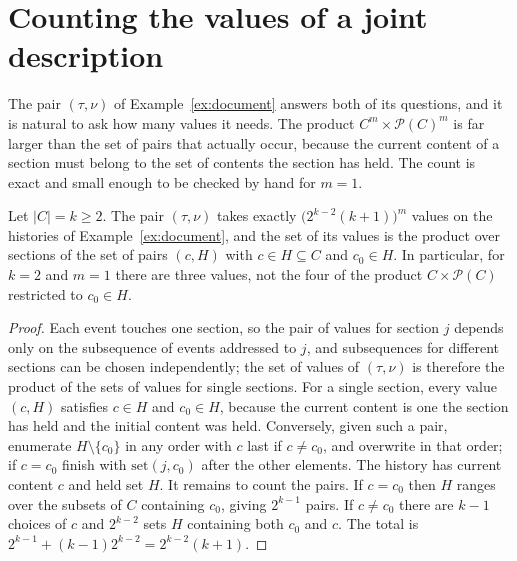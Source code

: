 \section{Counting the values of a joint description}\label{sec:doc-count}

The pair $(\tau,\nu)$ of Example~\ref{ex:document} answers both of its questions, and it is natural to ask how many values it needs. The product $C^{m}\times\mathcal P(C)^{m}$ is far larger than the set of pairs that actually occur, because the current content of a section must belong to the set of contents the section has held. The count is exact and small enough to be checked by hand for $m=1$.

\begin{newresult}\label{prop:doc-count}
Let $|C|=k\ge2$. The pair $(\tau,\nu)$ takes exactly $\bigl(2^{k-2}(k+1)\bigr)^{m}$ values on the histories of Example~\ref{ex:document}, and the set of its values is the product over sections of the set of pairs $(c,H)$ with $c\in H\subseteq C$ and $c_0\in H$. In particular, for $k=2$ and $m=1$ there are three values, not the four of the product $C\times\mathcal P(C)$ restricted to $c_0\in H$.
\end{newresult}
\begin{proof}
Each event touches one section, so the pair of values for section $j$ depends only on the subsequence of events addressed to $j$, and subsequences for different sections can be chosen independently; the set of values of $(\tau,\nu)$ is therefore the product of the sets of values for single sections. For a single section, every value $(c,H)$ satisfies $c\in H$ and $c_0\in H$, because the current content is one the section has held and the initial content was held. Conversely, given such a pair, enumerate $H\setminus\{c_0\}$ in any order with $c$ last if $c\ne c_0$, and overwrite in that order; if $c=c_0$ finish with $\mathrm{set}(j,c_0)$ after the other elements. The history has current content $c$ and held set $H$. It remains to count the pairs. If $c=c_0$ then $H$ ranges over the subsets of $C$ containing $c_0$, giving $2^{k-1}$ pairs. If $c\ne c_0$ there are $k-1$ choices of $c$ and $2^{k-2}$ sets $H$ containing both $c_0$ and $c$. The total is $2^{k-1}+(k-1)2^{k-2}=2^{k-2}(k+1)$.
\end{proof}

